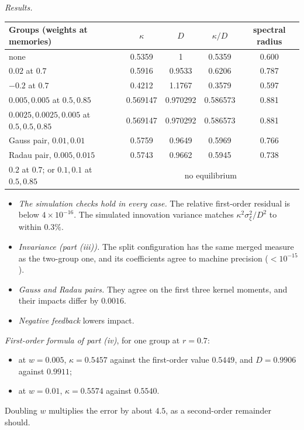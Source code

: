 \documentclass[12pt]{article}
\theoremstyle{definition}
\theoremstyle{remark}
\begin{document}
\emph{Results.}
\begin{center}\small
\begin{tabular}{lcccc}
\hline
Groups (weights at memories) & $\kappa$ & $D$ & $\kappa/D$ & spectral radius\\
\hline
none & 0.5359 & 1 & 0.5359 & 0.600\\
$0.02$ at $0.7$ & 0.5916 & 0.9533 & 0.6206 & 0.787\\
$-0.2$ at $0.7$ & 0.4212 & 1.1767 & 0.3579 & 0.597\\
$0.005,0.005$ at $0.5,0.85$ & 0.569147 & 0.970292 & 0.586573 & 0.881\\
$0.0025,0.0025,0.005$ at $0.5,0.5,0.85$ & 0.569147 & 0.970292 & 0.586573 & 0.881\\
Gauss pair, $0.01,0.01$ & 0.5759 & 0.9649 & 0.5969 & 0.766\\
Radau pair, $0.005,0.015$ & 0.5743 & 0.9662 & 0.5945 & 0.738\\
$0.2$ at $0.7$; or $0.1,0.1$ at $0.5,0.85$ & \multicolumn{4}{c}{no equilibrium}\\
\hline
\end{tabular}
\end{center}
\begin{itemize}[itemsep=1pt,topsep=2pt]
\item \emph{The simulation checks hold in every case.} The relative first-order residual is below $4\times10^{-16}$. The simulated innovation variance matches $\kappa^2\sigma_\xi^2/D^2$ to within $0.3\%$.
\item \emph{Invariance (part (iii)).} The split configuration has the same merged measure as the two-group one, and its coefficients agree to machine precision ($<10^{-15}$).
\item \emph{Gauss and Radau pairs.} They agree on the first three kernel moments, and their impacts differ by $0.0016$.
\item \emph{Negative feedback} lowers impact.
\end{itemize}

\emph{First-order formula of part (iv)}, for one group at $r=0.7$:
\begin{itemize}[itemsep=1pt,topsep=2pt]
\item at $w=0.005$, $\kappa=0.5457$ against the first-order value $0.5449$, and $D=0.9906$ against $0.9911$;
\item at $w=0.01$, $\kappa=0.5574$ against $0.5540$.
\end{itemize}
Doubling $w$ multiplies the error by about $4.5$, as a second-order remainder should.
\end{document}
